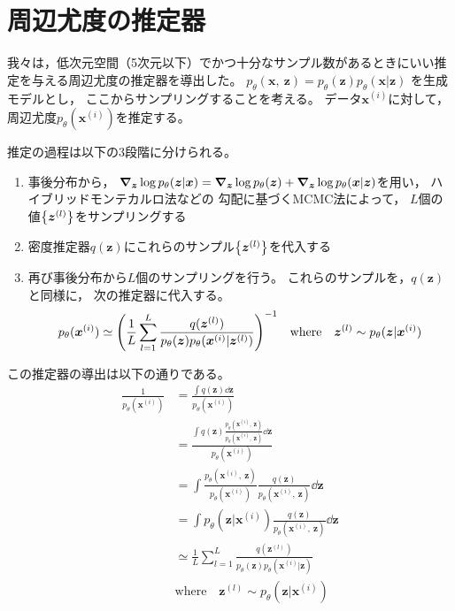\documentclass[dvipdfmx, fleqn, draft]{jsarticle}
\begin{document}
\section{周辺尤度の推定器}

我々は，低次元空間（5次元以下）でかつ十分なサンプル数があるときにいい推定を与える周辺尤度の推定器を導出した。
\(p_{\theta} (\bm{x},\ \bm{z}) = p_{\theta} (\bm{z}) p_{\theta} (\bm{x} | \bm{z})\)
を生成モデルとし，
ここからサンプリングすることを考える。
データ\(\bm{x}^{(i)}\)に対して，
周辺尤度\(p_{\theta} (\bm{x}^{(i)})\)を推定する。

推定の過程は以下の3段階に分けられる。

\begin{enumerate}
    \item
        事後分布から，
        \(\grad_{\bm{z}} \log{p_{\theta} (\bm{z} | \bm{x})} = \grad_{\bm{z}} \log{p_{\theta} (\bm{z})} + \grad_{\bm{z}} \log{p_{\theta} (\bm{x} | \bm{z})}\)を用い，
        ハイブリッドモンテカルロ法などの
        勾配に基づくMCMC法によって，
        \(L\)個の値\(\qty{\bm{z}^{(l)}}\)をサンプリングする
    \item
        密度推定器\(q(\bm{z})\)にこれらのサンプル\(\qty{\bm{z}^{(l)}}\)を代入する
    \item
        再び事後分布から\(L\)個のサンプリングを行う。
        これらのサンプルを，\(q(\bm{z})\)と同様に，
        次の推定器に代入する。
        \begin{equation*}
            p_{\theta} (\bm{x}^{(i)}) \simeq \qty(\frac{1}{L} \sum_{l=1}^{L} \frac{q(\bm{z}^{(l)})}{p_{\theta} (\bm{z}) p_{\theta} (\bm{x}^{(i)} | \bm{z}^{(l)})})^{-1}
            \quad \text{where} \quad
            \bm{z}^{(l)} \sim p_{\theta} (\bm{z} | \bm{x}^{(i)})
        \end{equation*}
\end{enumerate}
この推定器の導出は以下の通りである。
\begin{align*}
    \frac{1}{p_{\theta} (\bm{x}^{(i)})}
        & = \frac{\int q(\bm{z}) \dd{\bm{z}}}{p_{\theta} (\bm{x}^{(i)})} \\
        & = \frac{\int q(\bm{z}) \frac{p_{\theta} (\bm{x}^{(i)},\ \bm{z})}{p_{\theta} (\bm{x}^{(i)},\ \bm{z})} \dd{\bm{z}}}{p_{\theta} (\bm{x}^{(i)})} \\
        & = \int \frac{p_{\theta} (\bm{x}^{(i)},\ \bm{z})}{p_{\theta} (\bm{x}^{(i)})} \frac{q(\bm{z})}{p_{\theta} (\bm{x}^{(i)},\ \bm{z})} \dd{\bm{z}} \\
        & = \int p_{\theta} (\bm{z} | \bm{x}^{(i)}) \frac{q(\bm{z})}{p_{\theta} (\bm{x}^{(i)},\ \bm{z})} \dd{\bm{z}} \\
        & \simeq \frac{1}{L} \sum_{l=1}^{L} \frac{q(\bm{z}^{(l)})}{p_{\theta} (\bm{z}) p_{\theta} (\bm{x}^{(i)} | \bm{z})} \\
        & \text{where} \quad \bm{z}^{(l)} \sim p_{\theta} (\bm{z} | \bm{x}^{(i)})
\end{align*}
\end{document}
